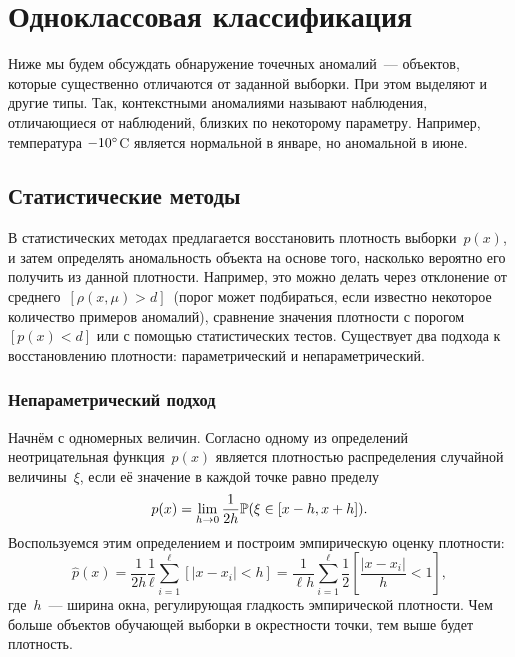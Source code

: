 \documentclass[12pt,fleqn]{article}
\begin{document}
\section{Одноклассовая классификация}

Ниже мы будем обсуждать обнаружение точечных аномалий~--- объектов,
которые существенно отличаются от заданной выборки.
При этом выделяют и другие типы.
Так, контекстными аномалиями называют наблюдения, отличающиеся
от наблюдений, близких по некоторому параметру.
Например, температура $-10\degree$C является нормальной в январе,
но аномальной в июне.

\subsection{Статистические методы}

В статистических методах предлагается восстановить плотность выборки~$p(x)$,
и затем определять аномальность объекта на основе того,
насколько вероятно его получить из данной плотности.
Например, это можно делать через отклонение от среднего~$[\rho(x, \mu) > d]$~(порог
может подбираться, если известно некоторое количество примеров аномалий),
сравнение значения плотности с порогом~$[p(x) < d]$
или с помощью статистических тестов.
Существует два подхода к восстановлению плотности: параметрический
и непараметрический.

\subsubsection{Непараметрический подход}

Начнём с одномерных величин.
Согласно одному из определений неотрицательная функция~$p(x)$
является плотностью распределения случайной величины~$\xi$, если её значение в каждой точке
равно пределу
\[
    p(x)
    =
    \lim_{h \to 0}
        \frac{1}{2h}
        \mathbb{P}(\xi \in [x - h, x + h]).
\]
Воспользуемся этим определением и построим эмпирическую оценку плотности:
\[
    \hat p(x)
    =
    \frac{1}{2h} \frac{1}{\ell}
    \sum_{i = 1}^{\ell}
        \left[
            |x - x_i| < h
        \right]
    =
    \frac{1}{\ell h}
    \sum_{i = 1}^{\ell}
        \frac12
        \left[
            \frac{|x - x_i|}{h} < 1
        \right],
\]
где~$h$~--- ширина окна, регулирующая гладкость эмпирической плотности.
Чем больше объектов обучающей выборки в окрестности точки, тем выше будет плотность.
\end{document}
